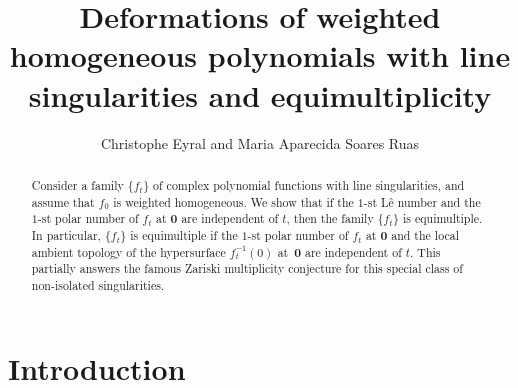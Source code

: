 \documentclass[a4paper,fleqn,11pt]{amsart}
\theoremstyle{definition}
\theoremstyle{remark}
\numberwithin{equation}{section}
\begin{document}
\title{Deformations of weighted homogeneous polynomials with line singularities and equimultiplicity} 

\author{Christophe Eyral and Maria Aparecida Soares Ruas}
\address{C. Eyral, Institute of Mathematics, Polish Academy of Sciences, \'Sniadeckich~8, 00-656 Warsaw, Poland}

\address{M. Ruas, Instituto de Ci\^encias Matem\'aticas e de Computa\c c\~ao, Universidade de S\~ao Paulo, Avenida Trabalhador S\~ao-Carlense, 400 - Centro, Caixa Postal 668, 13566-590 S\~ao Carlos - SP, Brazil}



\begin{abstract}
Consider a family $\{f_t\}$ of complex polynomial functions with line singularities, and assume that $f_0$ is weighted homogeneous. We show that if the $1$-st L\^e number and the $1$-st polar number of $f_t$ at $\mathbf{0}$ are independent of $t$, then the family $\{f_t\}$ is equimultiple. In particular, $\{f_t\}$ is equimultiple if the $1$-st polar number of $f_t$ at $\mathbf{0}$ and the local ambient topology of the hypersurface $f_t^{-1}(0)$ at~$\mathbf{0}$ are independent of $t$. This partially answers the famous Zariski multiplicity conjecture for this special class of non-isolated singularities.
\end{abstract}

\maketitle


\section{Introduction}\label{intro}
\end{document}
